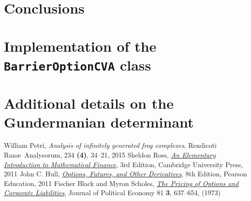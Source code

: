\documentclass[12pt, oneside]{book}
\theoremstyle{plain}
\theoremstyle{definition}
\begin{document}
\chapter{Conclusions}
\lipsum[100]

\appendix
\chapter{Implementation of the {\tt BarrierOptionCVA} class}
\lipsum[100]
\chapter[shorter running title]{Additional details on the Gundermanian determinant}
\lipsum[100]




\begin{thebibliography}{9}
   William Petri, 
  {\it Analysis of infinitely generated frog complexes},
	Rendicoti Ran\ae \ Analysorum, 234 {\bf (4)}, 34--21, 2015
  Sheldon Ross, {\it 
  \href{https://www-dawsonera-com.ezproxy.library.qmul.ac.uk/abstract/9781139069694}{An Elementary Introduction to Mathematical Finance}},
	3rd Edition, Cambridge University Press, 2011
	John C. Hull, 
	{\it \href{https://www-dawsonera-com.ezproxy.library.qmul.ac.uk/abstract/9781447930419}{Options, Futures, and Other Derivatives}},
	8th Edition, Pearson Education, 2011
	Fischer Black and  Myron Scholes,
	{\it \href{https://www.cs.princeton.edu/courses/archive/fall09/cos323/papers/black_scholes73.pdf}
	{The Pricing of Options and Corporate Liabilities}},
	Journal of Political Economy 81 {\bf 3}, 637--654,  (1973)
	
\end{thebibliography}
\end{document}
